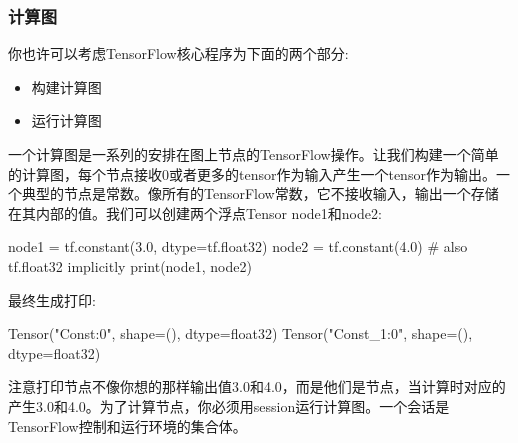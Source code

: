 \subsubsection{计算图}
你也许可以考虑TensorFlow核心程序为下面的两个部分:
\begin{itemize}
\item 构建计算图
\item 运行计算图
\end{itemize}
一个计算图是一系列的安排在图上节点的TensorFlow操作。让我们构建一个简单的计算图，每个节点接收0或者更多的tensor作为输入产生一个tensor作为输出。一个典型的节点是常数。像所有的TensorFlow常数，它不接收输入，输出一个存储在其内部的值。我们可以创建两个浮点Tensor node1和node2:

\begin{pythoncode}
node1 = tf.constant(3.0, dtype=tf.float32)
node2 = tf.constant(4.0) # also tf.float32 implicitly
print(node1, node2)
\end{pythoncode}

最终生成打印:
\begin{pythoncode}
Tensor("Const:0", shape=(), dtype=float32) Tensor("Const_1:0", shape=(), dtype=float32)
\end{pythoncode}
注意打印节点不像你想的那样输出值3.0和4.0，而是他们是节点，当计算时对应的产生3.0和4.0。为了计算节点，你必须用session运行计算图。一个会话是TensorFlow控制和运行环境的集合体。

